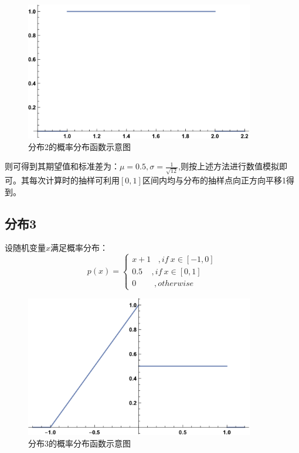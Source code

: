 \documentclass[a4paper,11pt]{article}
\begin{document}
\begin{figure}[!htbp]        
\centering
\includegraphics[width=10cm]{2.png}      
\caption{ 分布2的概率分布函数示意图}      
\end{figure}

则可得到其期望值和标准差为：$\mu = 0.5,\sigma = \frac{1}{\sqrt{12}}$,则按上述方法进行数值模拟即可。其每次计算时的抽样可利用$[0,1]$区间内均与分布的抽样点向正方向平移1得到。

\subsection{分布3}
设随机变量$x$满足概率分布：
\begin{equation}
p(x) = 
\left\{
\begin{array}{l}
x+1~~~~,if~x\in [-1,0]  \\
0.5~~~~~,if~x\in[0,1]  \\
0~~~~~~~~~~,otherwise	
\end{array}
\right.
\end{equation}

\begin{figure}[!htbp]        
\centering
\includegraphics[width=10cm]{3.png}      
\caption{ 分布3的概率分布函数示意图}      
\end{figure}
\end{document}
